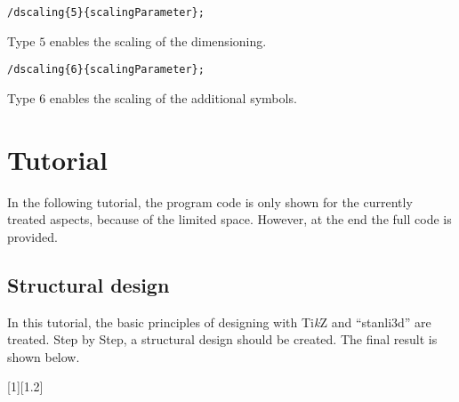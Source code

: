 \documentclass[%
  a4paper,
  BCOR20mm,
  pointlessnumbers,
  twoside,
  halfparskip,
  openright,
]{scrreprt}
\newcommand{\tikzsym}{Ti\emph{k}Z }
\begin{document}
\leftskip=7mm\lstinline[emph={dscaling}]|/dscaling{5}{scalingParameter};|

\leftskip=14mm Type $5$ enables the scaling of the dimensioning.

\leftskip=7mm\lstinline[emph={dscaling}]|/dscaling{6}{scalingParameter};|

\leftskip=14mm Type $6$ enables the scaling of the additional symbols.

\endgroup


\chapter{Tutorial}
\label{sec:Tutorial}

In the following tutorial, the program code is only shown for the currently treated aspects, because of the limited space. However, at the end the full code is provided.

\section{Structural design}
\label{sec:Tragwerkskonstruktion}

In this tutorial, the basic principles of designing with \tikzsym and ``stanli3d'' are treated. Step by Step, a structural design should be created. The final result is shown below.

[1][1.2]
\end{document}
